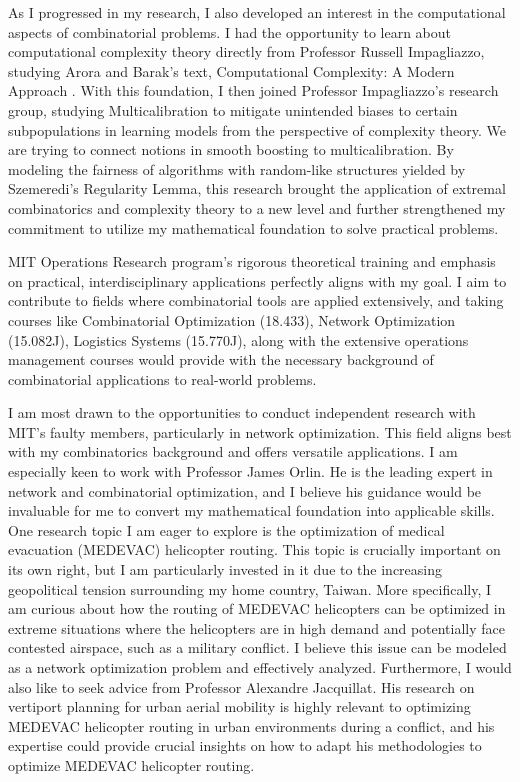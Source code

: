 \documentclass[12pt]{article}
\begin{document}
As I progressed in my research, I also developed an interest in the computational aspects of
combinatorial problems. I had the opportunity to learn about computational complexity theory
directly from Professor Russell Impagliazzo, studying Arora and Barak's text, Computational
Complexity: A Modern Approach \cite{arora2009computational}. With this foundation, I then joined
Professor Impagliazzo's research group, studying Multicalibration to mitigate unintended biases to
certain subpopulations in learning models from the perspective of complexity theory. We are trying
to connect notions in smooth boosting to multicalibration. By modeling the fairness of algorithms
with random-like structures yielded by Szemeredi's Regularity Lemma, this research brought the
application of extremal combinatorics and complexity theory to a new level and further strengthened
my commitment to utilize my mathematical foundation to solve practical problems.

MIT Operations Research program's rigorous theoretical training and emphasis on practical,
interdisciplinary applications perfectly aligns with my goal. I aim to contribute to fields where
combinatorial tools are applied extensively, and taking courses like Combinatorial Optimization
(18.433), Network Optimization (15.082J), Logistics Systems (15.770J), along with the extensive
operations management courses would provide with the necessary background of combinatorial
applications to real-world problems. 

I am most drawn to the opportunities to conduct independent research with MIT's faulty members,
particularly in network optimization. This field aligns best with my combinatorics background and
offers versatile applications. I am especially keen to work with Professor James Orlin. He is the
leading expert in network and combinatorial optimization, and I believe his guidance would be
invaluable for me to convert my mathematical foundation into applicable skills. One research topic I
am eager to explore is the optimization of medical evacuation (MEDEVAC) helicopter routing. This
topic is crucially important on its own right, but I am particularly invested in it due to the
increasing geopolitical tension surrounding my home country, Taiwan. More specifically, I am curious
about how the routing of MEDEVAC helicopters can be optimized in extreme situations where the
helicopters are in high demand and potentially face contested airspace, such as a military conflict.
I believe this issue can be modeled as a network optimization problem and effectively analyzed.
Furthermore, I would also like to seek advice from Professor Alexandre Jacquillat. His research on
vertiport planning for urban aerial mobility\cite{10.1287/msom.2022.1148} is highly relevant to
optimizing MEDEVAC helicopter routing in urban environments during a conflict, and his expertise
could provide crucial insights on how to adapt his methodologies to optimize MEDEVAC helicopter
routing.
\end{document}
